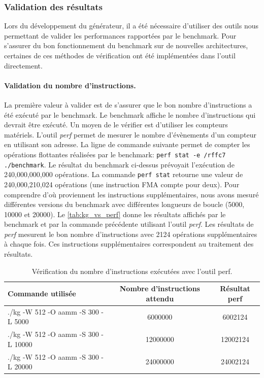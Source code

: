   
    
    
    \subsubsection{Validation des résultats}
    
        Lors du développement du générateur, il a été nécessaire d'utiliser des outils nous permettant de valider les performances rapportées par le benchmark. Pour s'assurer du bon fonctionnement du benchmark sur de nouvelles architectures, certaines de ces méthodes de vérification ont été implémentées dans l'outil directement. 
        
        \paragraph{Validation du nombre d'instructions.} 
            
            La première valeur à valider est de s'assurer que le bon nombre d'instructions a été exécuté par le benchmark. Le benchmark affiche le nombre d'instructions qui devrait être exécuté. Un moyen de le vérifier est d'utiliser les compteurs matériels. L'outil \textit{perf} permet de mesurer le nombre d'évènements d'un compteur en utilisant son adresse. La ligne de commande suivante permet de compter les opérations flottantes réalisées par le benchmark: \verb|perf stat -e /rffc7 ./benchmark|. Le résultat du benchmark ci-dessus prévoyait l'exécution de 240,000,000,000 opérations. La commande \verb|perf stat| retourne une valeur de 240,000,210,024 opérations (une instruction FMA compte pour deux). Pour comprendre d'où proviennent les instructions supplémentaires, nous avons mesuré différentes versions du benchmark avec différentes longueurs de boucle (5000, 10000 et 20000). Le \autoref{tab:kg_vs_perf} donne les résultats affichés par le benchmark et par la commande précédente utilisant l'outil \textit{perf}. Les résultats de \textit{perf} mesurent le bon nombre d'instructions avec 2124 opérations supplémentaires à chaque fois. Ces instructions supplémentaires correspondent au traitement des résultats.
    
            \begin{table}[h!]
            \centering
            \begin{tabular}{@{}lcc@{}}
            \toprule
             Commande utilisée & Nombre d'instructions attendu & Résultat perf \\ \midrule
            ./kg -W 512 -O aamm -S 300 -L 5000 & 6000000 & 6002124 \\
            ./kg -W 512 -O aamm -S 300 -L 10000 & 12000000 & 12002124 \\
            ./kg -W 512 -O aamm -S 300 -L 20000 & 24000000 & 24002124 \\ \bottomrule
            \end{tabular}%
            \caption{Vérification du nombre d'instructions exécutées avec l'outil perf.}
            \label{tab:kg_vs_perf}
            \end{table}
        
